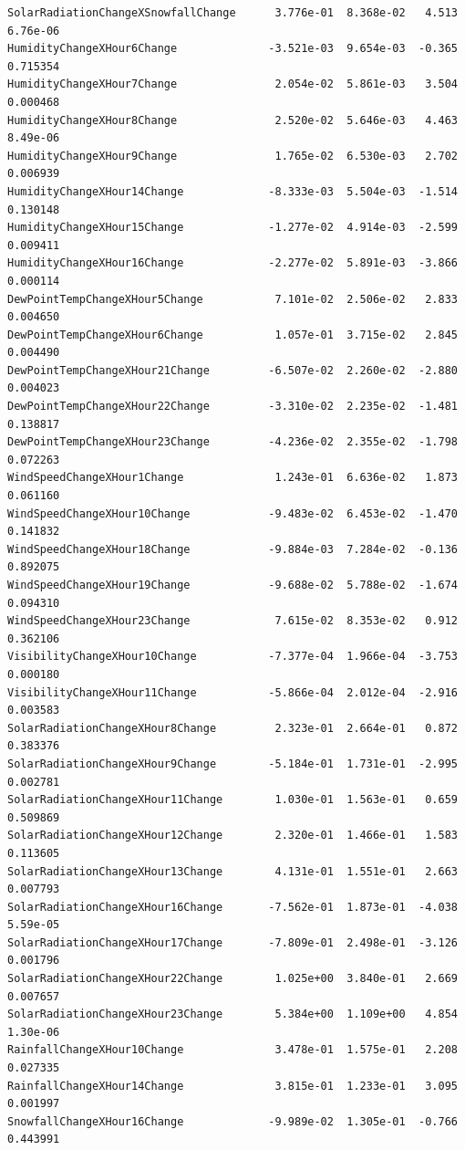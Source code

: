 \documentclass[
  letterpaper,
  DIV=11,
  numbers=noendperiod]{scrartcl}
\begin{document}
\begin{verbatim}
SolarRadiationChangeXSnowfallChange      3.776e-01  8.368e-02   4.513 6.76e-06
HumidityChangeXHour6Change              -3.521e-03  9.654e-03  -0.365 0.715354
HumidityChangeXHour7Change               2.054e-02  5.861e-03   3.504 0.000468
HumidityChangeXHour8Change               2.520e-02  5.646e-03   4.463 8.49e-06
HumidityChangeXHour9Change               1.765e-02  6.530e-03   2.702 0.006939
HumidityChangeXHour14Change             -8.333e-03  5.504e-03  -1.514 0.130148
HumidityChangeXHour15Change             -1.277e-02  4.914e-03  -2.599 0.009411
HumidityChangeXHour16Change             -2.277e-02  5.891e-03  -3.866 0.000114
DewPointTempChangeXHour5Change           7.101e-02  2.506e-02   2.833 0.004650
DewPointTempChangeXHour6Change           1.057e-01  3.715e-02   2.845 0.004490
DewPointTempChangeXHour21Change         -6.507e-02  2.260e-02  -2.880 0.004023
DewPointTempChangeXHour22Change         -3.310e-02  2.235e-02  -1.481 0.138817
DewPointTempChangeXHour23Change         -4.236e-02  2.355e-02  -1.798 0.072263
WindSpeedChangeXHour1Change              1.243e-01  6.636e-02   1.873 0.061160
WindSpeedChangeXHour10Change            -9.483e-02  6.453e-02  -1.470 0.141832
WindSpeedChangeXHour18Change            -9.884e-03  7.284e-02  -0.136 0.892075
WindSpeedChangeXHour19Change            -9.688e-02  5.788e-02  -1.674 0.094310
WindSpeedChangeXHour23Change             7.615e-02  8.353e-02   0.912 0.362106
VisibilityChangeXHour10Change           -7.377e-04  1.966e-04  -3.753 0.000180
VisibilityChangeXHour11Change           -5.866e-04  2.012e-04  -2.916 0.003583
SolarRadiationChangeXHour8Change         2.323e-01  2.664e-01   0.872 0.383376
SolarRadiationChangeXHour9Change        -5.184e-01  1.731e-01  -2.995 0.002781
SolarRadiationChangeXHour11Change        1.030e-01  1.563e-01   0.659 0.509869
SolarRadiationChangeXHour12Change        2.320e-01  1.466e-01   1.583 0.113605
SolarRadiationChangeXHour13Change        4.131e-01  1.551e-01   2.663 0.007793
SolarRadiationChangeXHour16Change       -7.562e-01  1.873e-01  -4.038 5.59e-05
SolarRadiationChangeXHour17Change       -7.809e-01  2.498e-01  -3.126 0.001796
SolarRadiationChangeXHour22Change        1.025e+00  3.840e-01   2.669 0.007657
SolarRadiationChangeXHour23Change        5.384e+00  1.109e+00   4.854 1.30e-06
RainfallChangeXHour10Change              3.478e-01  1.575e-01   2.208 0.027335
RainfallChangeXHour14Change              3.815e-01  1.233e-01   3.095 0.001997
SnowfallChangeXHour16Change             -9.989e-02  1.305e-01  -0.766 0.443991
                                           

\end{verbatim}
\end{document}
